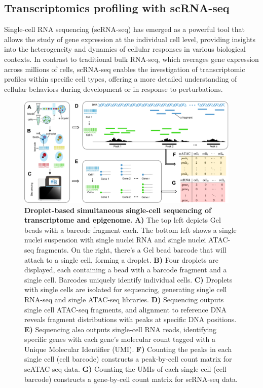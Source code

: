 \subsection{Transcriptomics profiling with scRNA-seq}
\label{background:sec1:scRNA}

Single-cell RNA sequencing (scRNA-seq) \citep{singlecellsequencing2014, singlecellsequencing2015} has emerged as a powerful tool that allows the study of gene expression at the individual cell level, providing insights into the heterogeneity and dynamics of cellular responses in various biological contexts. In contrast to traditional bulk RNA-seq, which averages gene expression across millions of cells, scRNA-seq enables the investigation of transcriptomic profiles within specific cell types, offering a more detailed understanding of cellular behaviors during development or in response to perturbations.

\begin{figure}[!ht]
	\centering
	\includegraphics[width=0.95\textwidth]{Sequencing/fig}
	\vspace{0.1cm}
	\caption[Droplet-based simultaneous single-cell sequencing of transcriptome and epigenome.]{\textbf{Droplet-based simultaneous single-cell sequencing of transcriptome and epigenome.} \textbf{A)} The top left depicts Gel beads with a barcode fragment each. The bottom left shows a single nuclei suspension with single nuclei RNA and single nuclei ATAC-seq fragments. On the right, there's a Gel bead barcode that will attach to a single cell, forming a droplet. \textbf{B)} Four droplets are displayed, each containing a bead with a barcode fragment and a single cell. Barcodes uniquely identify individual cells. \textbf{C)} Droplets with single cells are isolated for sequencing, generating single cell RNA-seq and single ATAC-seq libraries. \textbf{D)} Sequencing outputs single cell ATAC-seq fragments, and alignment to reference DNA reveals fragment distributions with peaks at specific DNA positions. \textbf{E)} Sequencing also outputs single-cell RNA reads, identifying specific genes with each gene's molecular count tagged with a Unique Molecular Identifier (UMI). \textbf{F)} Counting the peaks in each single cell (cell barcode) constructs a peak-by-cell count matrix for scATAC-seq data. \textbf{G)} Counting the UMIs of each single cell (cell barcode) constructs a gene-by-cell count matrix for scRNA-seq data.}
	\label{fig:scRNA_scATAC_to_count_matrix}
\end{figure}

